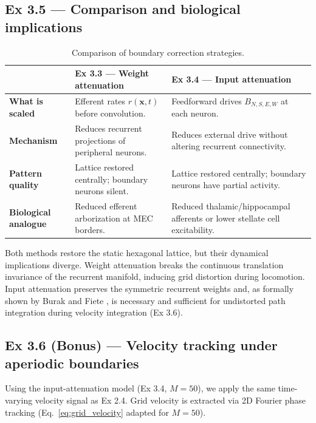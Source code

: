 \documentclass[10pt, a4paper]{article}
\begin{document}
\subsection{Ex 3.5 --- Comparison and biological implications}

\begin{table}[H]
    \centering
    \caption{Comparison of boundary correction strategies.}
    \label{tab:approaches}
    \small
    \begin{tabular}{@{}p{2.8cm}p{6.0cm}p{6.0cm}@{}}
        \toprule
        & \textbf{Ex 3.3 --- Weight attenuation} & \textbf{Ex 3.4 --- Input attenuation} \\
        \midrule
        \textbf{What is scaled} & Efferent rates $r(\mathbf{x},t)$ before convolution. & Feedforward drives $B_{N,S,E,W}$ at each neuron. \\
        \textbf{Mechanism} & Reduces recurrent projections of peripheral neurons. & Reduces external drive without altering recurrent connectivity. \\
        \textbf{Pattern quality} & Lattice restored centrally; boundary neurons silent. & Lattice restored centrally; boundary neurons have partial activity. \\
        \textbf{Biological analogue} & Reduced efferent arborization at MEC borders. & Reduced thalamic/hippocampal afferents or lower stellate cell excitability. \\
        \bottomrule
    \end{tabular}
\end{table}

Both methods restore the static hexagonal lattice, but their dynamical implications diverge. Weight attenuation breaks the continuous translation invariance of the recurrent manifold, inducing grid distortion during locomotion. Input attenuation preserves the symmetric recurrent weights and, as formally shown by Burak and Fiete \cite{burak2009}, is necessary and sufficient for undistorted path integration during velocity integration (Ex 3.6).

\subsection{Ex 3.6 (Bonus) --- Velocity tracking under aperiodic boundaries}

Using the input-attenuation model (Ex 3.4, $M=50$), we apply the same time-varying velocity signal as Ex 2.4. Grid velocity is extracted via 2D Fourier phase tracking (Eq.~\eqref{eq:grid_velocity} adapted for $M=50$).
\end{document}
